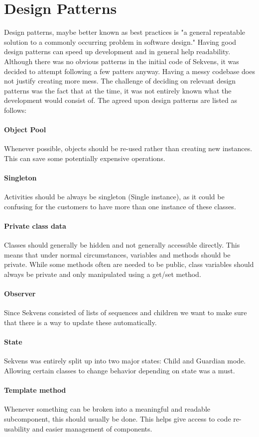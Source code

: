 \section{Design Patterns}\label{spr1_design_patterns}
Design patterns, maybe better known as best practices is "a general repeatable solution to a commonly occurring problem in software design." \cite{DesignPatterns} Having good design patterns can speed up development and in general help readability.
Although there was no obvious patterns in the initial code of Sekvens, it was decided to attempt following a few patters anyway. Having a messy codebase does not justify creating more mess.
The challenge of deciding on relevant design patterns was the fact that at the time, it was not entirely known what the development would consist of. 
The agreed upon design patterns are listed as follows:

\paragraph{Object Pool}
Whenever possible, objects should be re-used rather than creating new instances. This can save some potentially expensive operations.

\paragraph{Singleton}
Activities should be always be singleton (Single instance), as it could be confusing for the customers to have more than one instance of these classes.

\paragraph{Private class data}
Classes should generally be hidden and not generally accessible directly. This means that under normal circumstances, variables and methods should be private. While some methods often are needed to be public, class variables should always be private and only manipulated using a get/set method.

\paragraph{Observer}
Since Sekvens consisted of lists of sequences and children we want to make sure that there is a way to update these automatically.

\paragraph{State}
Sekvens was entirely split up into two major states: Child and Guardian mode. Allowing certain classes to change behavior depending on state was a must.

\paragraph{Template method}
Whenever something can be broken into a meaningful and readable subcomponent, this should usually be done. This helps give access to code re-usability and easier management of components.
